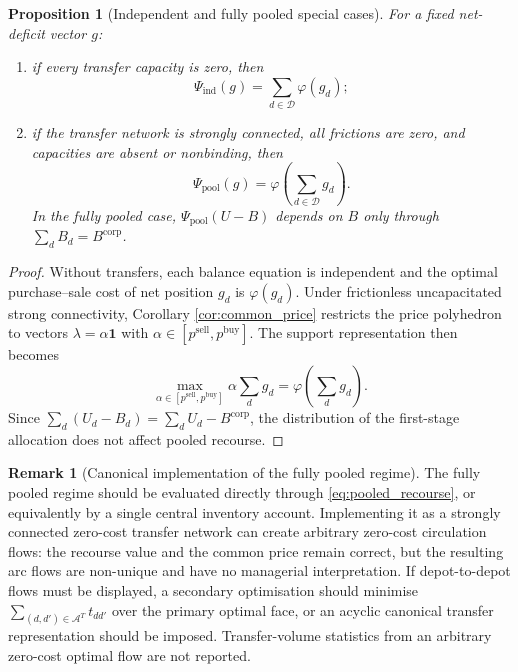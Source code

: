 \documentclass[authoryear,final,3p,times]{elsarticle}
\newtheorem{proposition}{Proposition}
\theoremstyle{definition}
\newtheorem{remark}{Remark}
\theoremstyle{plain}
\begin{document}
\begin{proposition}[Independent and fully pooled special cases]
\label{prop:institutional_cases}
For a fixed net-deficit vector $g$:
\begin{enumerate}
\item if every transfer capacity is zero, then
\begin{equation}
\Psi_{\mathrm{ind}}(g)=\sum_{d\in\mathcal D}\varphi(g_d);
\label{eq:independent_recourse}
\end{equation}
\item if the transfer network is strongly connected, all frictions are zero,
      and capacities are absent or nonbinding, then
\begin{equation}
\Psi_{\mathrm{pool}}(g)=\varphi\!\left(\sum_{d\in\mathcal D}g_d\right).
\label{eq:pooled_recourse}
\end{equation}
In the fully pooled case, $\Psi_{\mathrm{pool}}(U-B)$ depends on $B$ only
through $\sum_dB_d=B^{\mathrm{corp}}$.
\end{enumerate}
\end{proposition}

\begin{proof}
Without transfers, each balance equation is independent and the optimal
purchase--sale cost of net position $g_d$ is $\varphi(g_d)$.  Under
frictionless uncapacitated strong connectivity, Corollary
\ref{cor:common_price} restricts the price polyhedron to vectors
$\lambda=\alpha\mathbf 1$ with
$\alpha\in[p^{\mathrm{sell}},p^{\mathrm{buy}}]$.  The support representation
then becomes
\begin{equation*}
\max_{\alpha\in[p^{\mathrm{sell}},p^{\mathrm{buy}}]}
\alpha\sum_dg_d
=\varphi\!\left(\sum_dg_d\right).
\end{equation*}
Since $\sum_d(U_d-B_d)=\sum_dU_d-B^{\mathrm{corp}}$, the distribution of the
first-stage allocation does not affect pooled recourse.
\end{proof}

\begin{remark}[Canonical implementation of the fully pooled regime]
\label{rem:canonical_pooling}
The fully pooled regime should be evaluated directly through
\eqref{eq:pooled_recourse}, or equivalently by a single central inventory
account.  Implementing it as a strongly connected zero-cost transfer network
can create arbitrary zero-cost circulation flows: the recourse value and the
common price remain correct, but the resulting arc flows are non-unique and
have no managerial interpretation.  If depot-to-depot flows must be displayed,
a secondary optimisation should minimise $\sum_{(d,d')\in\mathcal A^T}t_{dd'}$
over the primary optimal face, or an acyclic canonical transfer representation
should be imposed.  Transfer-volume statistics from an arbitrary zero-cost
optimal flow are not reported.
\end{remark}
\end{document}
